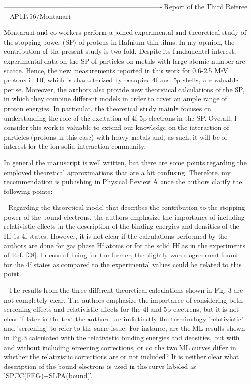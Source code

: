 ----------------------------------------------------------------------
Report of the Third Referee -- AP11756/Montanari
----------------------------------------------------------------------

Montarani and co-workers perform a joined experimental and theoretical
study of the stopping power (SP) of protons in Hafnium thin films. In
my opinion, the contribution of the present study is two-fold. Despite
its fundamental interest, experimental data on the SP of particles on
metals with large atomic number are scarce. Hence, the new
measurements reported in this work for 0.6-2.5 MeV protons in Hf,
which is characterized by occupied 4f and 5p shells, are valuable per
se. Moreover, the authors also provide new theoretical calculations of
the SP, in which they combine different models in order to cover an
ample range of proton energies. In particular, the theoretical study
mainly focuses on understanding the role of the excitation of 4f-5p
electrons in the SP. Overall, I consider this work is valuable to
extend our knowledge on the interaction of particles (protons in this
case) with heavy metals and, as such, it will be of interest for the
ion-solid interaction community.

In general the manuscript is well written, but there are some points
regarding the employed theoretical approximations that are a bit
confusing. Therefore, my recommendation is publishing in Physical
Review A once the authors clarify the following points:

- Regarding the theoretical model that describes the contribution to
the stopping power of the bound electrons, the authors emphasize the
importance of including relativistic effects in the description of the
binding energies and densities of the Hf 1s-4f states. However, it is
not clear if the calculations performed by the authors are done for
gas phase Hf atoms or for the solid Hf as in the experiments of Ref.
[38]. In case of being for the former, the slightly worse agreement
found for the 4f states as compared to the experimental values could
be related to this point.

- The results from the three different theoretical calculations shown
in Fig. 3 are not completely clear. The authors emphasize the
importance of considering both screening effects and relativistic
effects for the 4f and 5p electrons, but it is not clear if later in
the text the authors use indistinctly the terminology 'relativistic'
and 'screening' to refer to the same issue. For instance, are the ML
results shown in Fig.3 calculated with the relativistic binding
energies and densities, but with and without including screening
corrections, or do the two ML curves differ in whether the
relativistic corrections are or not included? It is neither clear what
description of the bound electrons is used in the curve labeled as
'SPCC(FEG)+SLPA(bound)'.

